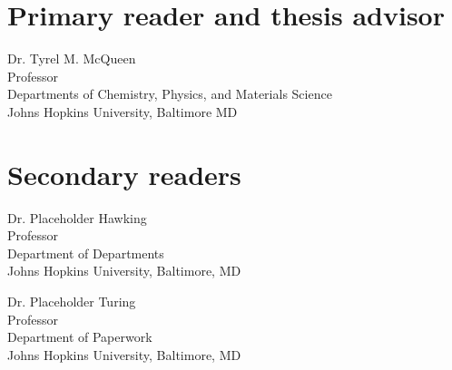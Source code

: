 \begin{singlespace}

    \section*{Primary reader and thesis advisor}
    
    Dr. Tyrel M. McQueen \\
    Professor\\
    Departments of Chemistry, Physics, and Materials Science\\
    Johns Hopkins University, Baltimore MD 


    \section*{Secondary readers}
    
    Dr. Placeholder Hawking\\
    Professor\\
    Department of Departments \\
    Johns Hopkins University, Baltimore, MD 
    
    \vspace{0.1in}
    
    Dr. Placeholder Turing \\
    Professor\\
    Department of Paperwork \\
    Johns Hopkins University, Baltimore, MD 



\end{singlespace}